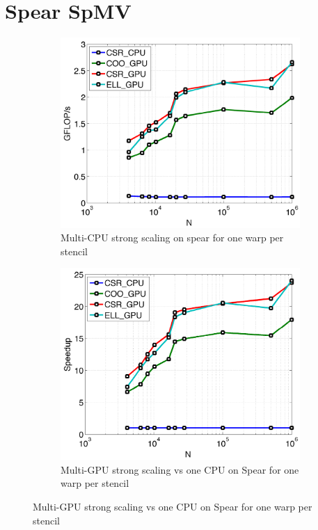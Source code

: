 \section{Spear SpMV} 

\begin{figure}[htbp]
\centering
\begin{subfigure}[b]{0.425\textwidth}
\centering
\includegraphics[width=1.0\textwidth]{../figures/spear_results/spmv/spmv_vcl_gflops-eps-converted-to.pdf}
\caption{Multi-CPU strong scaling on spear for one warp per stencil}
\label{fig:alltoall_multicpu_scaling}
\end{subfigure} 
\begin{subfigure}[b]{0.425\textwidth}
\centering
\includegraphics[width=1.0\textwidth]{../figures/spear_results/spmv/spmv_vcl_speedup-eps-converted-to.pdf}
\caption{Multi-GPU strong scaling vs one CPU on Spear for one warp per stencil}
\label{fig:alltoall_multigpu_vs_cpu_scaling}
\end{subfigure} 
\end{figure}



